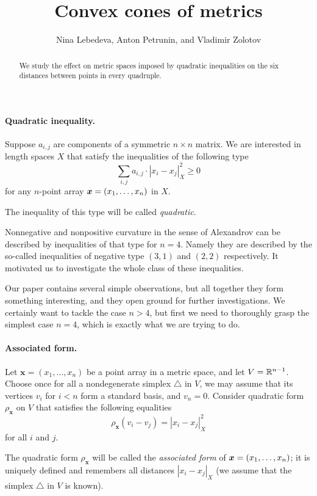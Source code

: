 \documentclass[a4paper,10pt]{article}
\def\thetitle{Convex cones of metrics}
\def\theauthors{Nina Lebedeva, Anton Petrunin, and Vladimir Zolotov}
\begin{document}


\title{\thetitle}
\author{\theauthors}
\date{}
\maketitle

\begin{abstract}
We study the effect on metric spaces imposed by quadratic inequalities on the six distances between points in every quadruple.
\end{abstract}

\paragraph{Quadratic inequality.}\label{par:quadratic-inq}
Suppose $a_{i,j}$ are components of a symmetric $n{\times}n$ matrix.
We are interested in length spaces $X$ that
satisfy the inequalities of the following type
\[\sum_{i,j}a_{i,j}\cdot|x_i-x_j|_X^2\ge 0\]
for any $n$-point array $\bm{x}\z=(x_1,\dots,x_n)$ in $X$.

The inequality of this type will be called \emph{quadratic}.


Nonnegative and nonpositive curvature in the sense of Alexandrov can be described by inequalities of that type for $n=4$.
Namely they are described by the so-called inequalities of negative type $(3,1)$ and $(2,2)$ respectively.
It motivated us to investigate the whole class of these inequalities.

Our paper contains several simple observations, but all together they form something interesting, and they open ground for further investigations.
We certainly want to tackle the case $n>4$, but first we need to thoroughly grasp the simplest case $n=4$, which is exactly what we are trying to do.

\paragraph{Associated form.}\label{Associated form}
Let $\bm{x}=(x_1,\dots,x_n)$ be a point array in a metric space, and let $V\z=\RR^{n-1}$.
Choose once for all a nondegenerate simplex $\triangle$ in $V$,
we may assume that its vertices $v_i$ for $i<n$ form a standard basis, and $v_n=0$.
Consider quadratic form $\rho_{\bm{x}}$ on $V$ that satisfies the following equalities
\[\rho_{\bm{x}}(v_i-v_j)=|x_i-x_j|^2_X\] 
for all $i$ and $j$.

The quadratic form $\rho_{\bm{x}}$ will be called the \emph{associated form} of $\bm{x}=(x_1,\z\dots,x_n)$;
it is uniquely defined and remembers all distances $|x_i-x_j|_X$
(we assume that the simplex $\triangle$ in $V$ is known).
\end{document}
